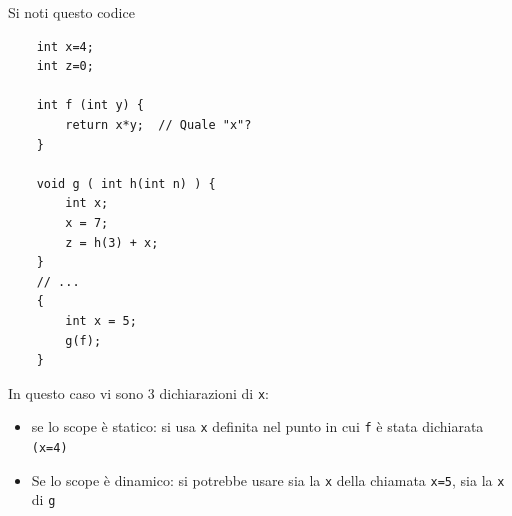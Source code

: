 Si noti questo codice
\begin{lstlisting}
    int x=4; 
    int z=0;

    int f (int y) {
        return x*y;  // Quale "x"?
    }

    void g ( int h(int n) ) {
        int x;
        x = 7;
        z = h(3) + x;
    }
    // ...
    { 
        int x = 5;
        g(f);
    }
\end{lstlisting}
In questo caso vi sono 3 dichiarazioni di \texttt{x}:
\begin{itemize}
    \item se lo scope è statico: si usa \texttt{x} definita nel punto in cui \texttt{f} è stata dichiarata \texttt{(x=4)}
    \item Se lo scope è dinamico: si potrebbe usare sia la \texttt{x} della chiamata \texttt{x=5}, sia la \texttt{x} di \texttt{g}
\end{itemize}